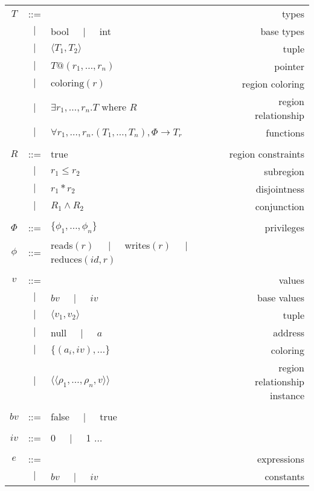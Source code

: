 \newcommand{\oton}[1]{{#1}_1,\ldots,{#1}_n}
\newcommand{\otok}[2]{{#2}_1,\ldots,{#2}_{#1}}

\begin{table*}
\centering
{\small
\begin{tabular}{cclr}

$T$ & ::= &  & types \\
  &$\mid$& bool $\;\;\;\mid\;\;\;$ int & base types \\
  &$\mid$& $\langle T_1, T_2 \rangle$ & tuple \\
  &$\mid$& $T@(\oton{r})$ & pointer \\
  &$\mid$& $\text{coloring}(r)$ & region coloring \\
  &$\mid$& $\exists \oton{r}. T\text{ where }R$ & region relationship \\
  &$\mid$& $\forall \oton{r}. (\oton{T}), \Phi \rightarrow T_r$ & functions \\
\\
$R$ & ::= & true & region constraints \\
  &$\mid$& $r_1 \leq r_2$ & subregion \\
  &$\mid$& $r_1 * r_2$ & disjointness \\
  &$\mid$& $R_1 \wedge R_2$ & conjunction \\
\\
$\Phi$ & ::= & $\{ \oton{\phi} \}$ & privileges \\
$\phi$ & ::= & reads$(r)$ $\;\;\;\mid\;\;\;$ writes$(r)$ $\;\;\;\mid\;\;\;$ reduces$(id,r)$ & \\
\\
$v$ & ::= & & values \\
  &$\mid$& $bv$ $\;\;\;\mid\;\;\;$ $iv$ & base values \\
  &$\mid$& $\langle v_1, v_2 \rangle$ & tuple \\
  &$\mid$& null $\;\;\;\mid\;\;\;$ $a$ & address \\
  &$\mid$& $\{ (a_i, iv), \ldots \}$ & coloring \\
  &$\mid$& $\langle \langle \oton{\rho}, v\rangle \rangle$ & region relationship instance \\
\\
$bv$ & ::= & false $\;\;\;\mid\;\;\;$ true \\
\\
$iv$ & ::= & 0 $\;\;\;\mid\;\;\;$ 1 $\ldots$ \\
\\
$e$ & ::= & & expressions \\
  &$\mid$& $bv$ $\;\;\;\mid\;\;\;$ $iv$ & constants \\

\end{tabular}}
\end{table*}
